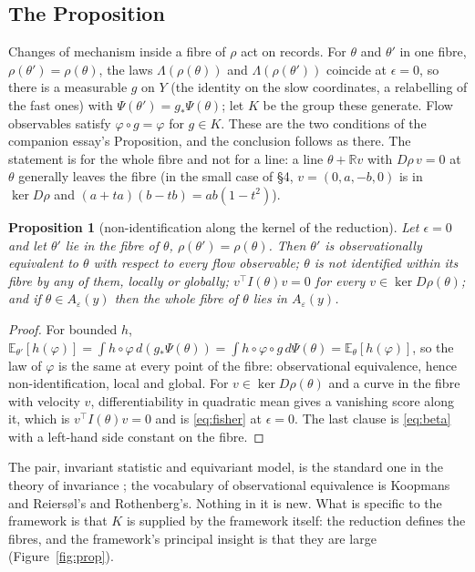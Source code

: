 \documentclass[10pt]{article}
\newtheorem{proposition}{Proposition}
\begin{document}
\subsection{The Proposition}
Changes of mechanism inside a fibre of $\rho$ act on records. For $\theta$ and $\theta'$ in one fibre, $\rho(\theta')=\rho(\theta)$, the laws $\Lambda(\rho(\theta))$ and $\Lambda(\rho(\theta'))$ coincide at $\epsilon=0$, so there is a measurable $g$ on $Y$ (the identity on the slow coordinates, a relabelling of the fast ones) with $\Psi(\theta')=g_{*}\Psi(\theta)$; let $K$ be the group these generate. Flow observables satisfy $\varphi\circ g=\varphi$ for $g\in K$. These are the two conditions of the companion essay's Proposition, and the conclusion follows as there. The statement is for the whole fibre and not for a line: a line $\theta+\mathbb{R}v$ with $D\rho\,v=0$ at $\theta$ generally leaves the fibre (in the small case of \S4, $v=(0,a,-b,0)$ is in $\ker D\rho$ and $(a+ta)(b-tb)=ab(1-t^2)$).
\begin{proposition}[non-identification along the kernel of the reduction]
Let $\epsilon=0$ and let $\theta'$ lie in the fibre of $\theta$, $\rho(\theta')=\rho(\theta)$. Then $\theta'$ is observationally equivalent to $\theta$ with respect to every flow observable; $\theta$ is not identified within its fibre by any of them, locally or globally; $v^{\top}I(\theta)v=0$ for every $v\in\ker D\rho(\theta)$; and if $\theta\in A_\varepsilon(y)$ then the whole fibre of $\theta$ lies in $A_\varepsilon(y)$.
\end{proposition}
\begin{proof}
For bounded $h$, $\mathbb{E}_{\theta'}[h(\varphi)]=\int h\circ\varphi\,d(g_{*}\Psi(\theta))=\int h\circ\varphi\circ g\,d\Psi(\theta)=\mathbb{E}_\theta[h(\varphi)]$, so the law of $\varphi$ is the same at every point of the fibre: observational equivalence, hence non-identification, local and global. For $v\in\ker D\rho(\theta)$ and a curve in the fibre with velocity $v$, differentiability in quadratic mean gives a vanishing score along it, which is $v^{\top}I(\theta)v=0$ and is \eqref{eq:fisher} at $\epsilon=0$. The last clause is \eqref{eq:beta} with a left-hand side constant on the fibre.
\end{proof}
The pair, invariant statistic and equivariant model, is the standard one in the theory of invariance \parencite[ch.~6]{lehmann2005}; the vocabulary of observational equivalence is Koopmans and Reiers{\o}l's and Rothenberg's. Nothing in it is new. What is specific to the framework is that $K$ is supplied by the framework itself: the reduction defines the fibres, and the framework's principal insight is that they are large (Figure~\ref{fig:prop}).
\end{document}
